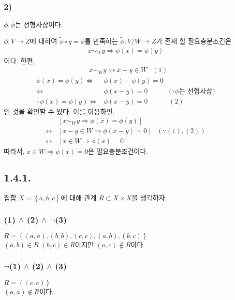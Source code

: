 \documentclass{article}
\begin{document}
\subsubsection{2)}
$\phi, \widetilde{\phi}$는 선형사상이다.

$\phi : V \rightarrow Z$에 대하여 $\widetilde{\phi} \circ q = \phi$를 만족하는 $\widetilde{\phi} : V/W \rightarrow Z$가 존재 할 필요충분조건은
\begin{align*}
x \sim_{W} y \Rightarrow \phi(x) = \phi(y)
\end{align*}
이다. 한편,
\begin{align*}
&x \sim_{W} y \iff x - y \in W & (1)
\end{align*}
\begin{align*}
\phi(x) = \phi(y) \iff& \phi(x) - \phi(y) = 0 &
\\ \iff& \phi(x - y) = 0 &\text{($\because \phi$는 선형사상)}
\\ \therefore \phi(x) = \phi(y) \iff& \phi(x - y) = 0& (2)
\end{align*}
인 것을 확인할 수 있다. 이를 이용하면, 
\begin{align*}
&\left[ x \sim_{W} y \Rightarrow \phi(x) = \phi(y) \right] &
\\ \iff &\left[ x - y \in W \Rightarrow \phi(x - y) = 0 \right] &(\because (1), (2))
\\ \iff &\left[ x \in W \Rightarrow \phi(x) = 0 \right] &
\end{align*}
따라서, $ x \in W \Rightarrow \phi(x) = 0$은 필요충분조건이다.

\subsection{1.4.1.}
집합 $X = \left\{a, b, c\right\}$에 대해 관계 $R \subset X \times X$를 생각하자.
\subsubsection{(1) $\wedge$ (2) $\wedge$ $\lnot$(3)}
$R = \left\{(a, a), (b, b), (c, c), (a, b), (b, c) \right\}$
\\$(a, b) \in R$ $(b, c) \in R$이지만 $(a, c) \notin R$이다.

\subsubsection{$\lnot$(1) $\wedge$ (2) $\wedge$ (3)}
$R = \left\{(c, c) \right\}$
\\$(a, a) \notin R$이다.
\end{document}
